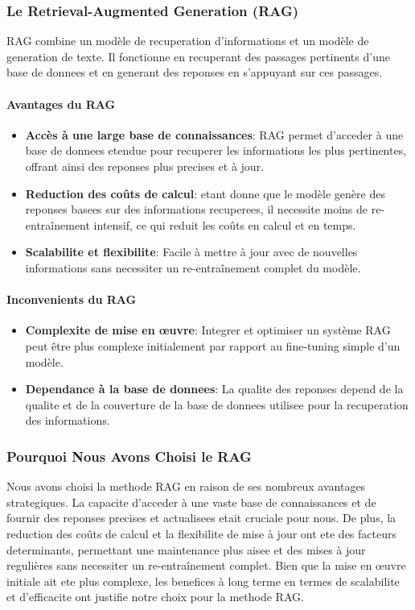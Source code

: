 \subsubsection{Le Retrieval-Augmented Generation (RAG)}
RAG combine un modèle de recuperation d'informations et un modèle de generation de texte. Il fonctionne en recuperant des passages pertinents d'une base de donnees et en generant des reponses en s'appuyant sur ces passages.

\paragraph{Avantages du RAG}
\begin{itemize}
    \item \textbf{Accès à une large base de connaissances}: RAG permet d'acceder à une base de donnees etendue pour recuperer les informations les plus pertinentes, offrant ainsi des reponses plus precises et à jour.
    \item \textbf{Reduction des coûts de calcul}: etant donne que le modèle genère des reponses basees sur des informations recuperees, il necessite moins de re-entraînement intensif, ce qui reduit les coûts en calcul et en temps.
    \item \textbf{Scalabilite et flexibilite}: Facile à mettre à jour avec de nouvelles informations sans necessiter un re-entraînement complet du modèle.
\end{itemize}

\paragraph{Inconvenients du RAG}
\begin{itemize}
    \item \textbf{Complexite de mise en œuvre}: Integrer et optimiser un système RAG peut être plus complexe initialement par rapport au fine-tuning simple d'un modèle.
    \item \textbf{Dependance à la base de donnees}: La qualite des reponses depend de la qualite et de la couverture de la base de donnees utilisee pour la recuperation des informations.
\end{itemize}

\subsubsection{Pourquoi Nous Avons Choisi le RAG}
Nous avons choisi la methode RAG en raison de ses nombreux avantages strategiques. La capacite d'acceder à une vaste base de connaissances et de fournir des reponses precises et actualisees etait cruciale pour nous. De plus, la reduction des coûts de calcul et la flexibilite de mise à jour ont ete des facteurs determinants, permettant une maintenance plus aisee et des mises à jour regulières sans necessiter un re-entraînement complet. Bien que la mise en œuvre initiale ait ete plus complexe, les benefices à long terme en termes de scalabilite et d'efficacite ont justifie notre choix pour la methode RAG.


